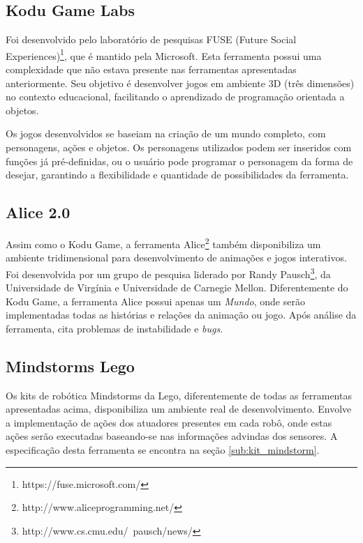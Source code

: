 	\subsection{Kodu Game Labs} %
	\label{sub:kodu_game_labs}

		Foi desenvolvido pelo laboratório de pesquisas FUSE (Future Social Experiences)\footnote{https://fuse.microsoft.com/}, que é mantido pela Microsoft. Esta ferramenta possui uma complexidade que não estava presente nas ferramentas apresentadas anteriormente. Seu objetivo é desenvolver jogos em ambiente 3D (três dimensões) no contexto educacional, facilitando o aprendizado de programação orientada a objetos. 

		Os jogos desenvolvidos se baseiam na criação de um mundo completo, com personagens, ações e objetos. Os personagens utilizados podem ser inseridos com funções já pré-definidas, ou o usuário pode programar o personagem da forma de desejar, garantindo a flexibilidade e quantidade de possibilidades da ferramenta.
	

	\subsection{Alice 2.0} %
	\label{sub:alice}
		Assim como o Kodu Game, a ferramenta Alice\footnote{http://www.aliceprogramming.net/} também disponibiliza um ambiente tridimensional para desenvolvimento de animações e jogos interativos. Foi desenvolvida por um grupo de pesquisa liderado por Randy Pausch\footnote{http://www.cs.cmu.edu/~pausch/news/}, da Universidade de Virgínia e Universidade de Carnegie Mellon. Diferentemente do Kodu Game, a ferramenta Alice possui apenas um \textit{Mundo}, onde serão implementadas todas as histórias e relações da animação ou jogo. Após análise da ferramenta, \cite{analiseFerramentaEnsinoComputacao} cita problemas de instabilidade e \textit{bugs}.
	

	\subsection{Mindstorms Lego} %
	\label{sub:mindstorm_lego}

		Os kits de robótica Mindstorms da Lego, diferentemente de todas as ferramentas apresentadas acima, disponibiliza um ambiente real de desenvolvimento. Envolve a implementação de ações dos atuadores presentes em cada robô, onde estas ações serão executadas baseando-se nas informações advindas dos sensores. A especificação desta ferramenta se encontra na seção \ref{sub:kit_mindstorm}.
	
